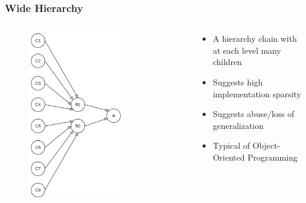 \documentclass[dvipsnames, 10pt]{beamer}
\begin{document}
\begin{frame}
  \frametitle{Wide Hierarchy}
  \begin{columns}
    \begin{column}{0.5\textwidth}
      \begin{figure}
        \begin{center}
          \includegraphics[width=0.7\textwidth]{figures/architectural-smells/wide-hierarchy.png}
        \end{center}
      \end{figure}
    \end{column}
    \begin{column}{0.5\textwidth}
      \begin{itemize}
        \item A hierarchy chain with at each level many children
        \item Suggests high implementation sparsity
        \item Suggests abuse/loss of generalization
        \item Typical of Object-Oriented Programming
      \end{itemize}
    \end{column}
  \end{columns}
\end{frame}
\end{document}

